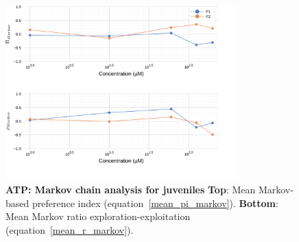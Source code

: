 \begin{appendices}
\begin{figure}[h]
      \label{adenosine_markov}
    \end{figure}
    \begin{figure}[h]
      \centering
      \includegraphics[width=0.8\textwidth]{part_2/assets/atp_markov.png}
      \caption{\textbf{ATP: Markov chain analysis for juveniles} \textbf{Top}: Mean Markov-based preference index (equation~\ref{mean_pi_markov}). \textbf{Bottom}: Mean Markov ratio exploration-exploitation (equation~\ref{mean_r_markov}).}
      \label{atp_markov}
    \end{figure}


\end{appendices}
